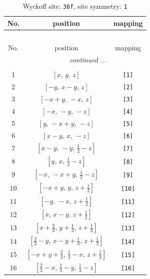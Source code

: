 \documentclass[fleqn,8pt]{jsarticle}
\begin{document}
\renewcommand{\arraystretch}{1.2}
\begin{longtable}{ccc}
\caption{Wyckoff site: {\tt 36f}, site symmetry: {\tt 1}}
 \\
 \hline \hline
No. & position & mapping \\ \hline \endfirsthead

\multicolumn{2}{l}{\tablename\ \thetable{}} \\
 \hline \hline
No. & position & mapping \\ \hline \endhead

 \hline \hline
\multicolumn{2}{r}{\footnotesize\it continued ...} \\ \endfoot

 \hline \hline
\multicolumn{2}{r}{} \\ \endlastfoot

1 & $\left[ x,\, y,\, z \right]$ & {\tt [1]} \\ \hline
2 & $\left[ - y,\, x - y,\, z \right]$ & {\tt [2]} \\ \hline
3 & $\left[ - x + y,\, - x,\, z \right]$ & {\tt [3]} \\ \hline
4 & $\left[ - x,\, - y,\, - z \right]$ & {\tt [4]} \\ \hline
5 & $\left[ y,\, - x + y,\, - z \right]$ & {\tt [5]} \\ \hline
6 & $\left[ x - y,\, x,\, - z \right]$ & {\tt [6]} \\ \hline
7 & $\left[ x - y,\, - y,\, \frac{1}{2} - z \right]$ & {\tt [7]} \\ \hline
8 & $\left[ y,\, x,\, \frac{1}{2} - z \right]$ & {\tt [8]} \\ \hline
9 & $\left[ - x,\, - x + y,\, \frac{1}{2} - z \right]$ & {\tt [9]} \\ \hline
10 & $\left[ - x + y,\, y,\, z + \frac{1}{2} \right]$ & {\tt [10]} \\ \hline
11 & $\left[ - y,\, - x,\, z + \frac{1}{2} \right]$ & {\tt [11]} \\ \hline
12 & $\left[ x,\, x - y,\, z + \frac{1}{2} \right]$ & {\tt [12]} \\ \hline
13 & $\left[ x + \frac{2}{3},\, y + \frac{1}{3},\, z + \frac{1}{3} \right]$ & {\tt [13]} \\ \hline
14 & $\left[ \frac{2}{3} - y,\, x - y + \frac{1}{3},\, z + \frac{1}{3} \right]$ & {\tt [14]} \\ \hline
15 & $\left[ - x + y + \frac{2}{3},\, \frac{1}{3} - x,\, z + \frac{1}{3} \right]$ & {\tt [15]} \\ \hline
16 & $\left[ \frac{2}{3} - x,\, \frac{1}{3} - y,\, \frac{1}{3} - z \right]$ & {\tt [16]} \\ \hline

\end{longtable}
\end{document}
